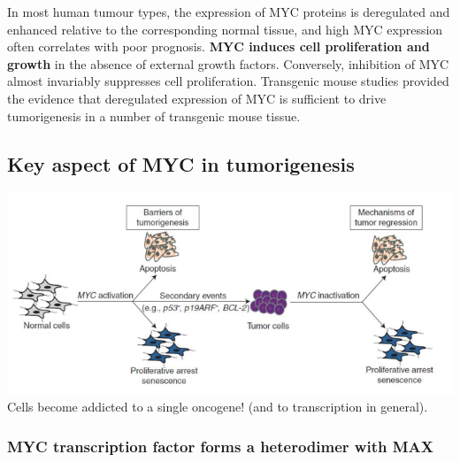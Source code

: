 In most human tumour types, the expression of MYC proteins is deregulated and enhanced relative to the corresponding normal tissue, and high MYC expression often correlates with poor prognosis. \textbf{MYC induces cell proliferation and growth} in the absence of external growth factors. Conversely, inhibition of MYC almost invariably suppresses cell proliferation.
Transgenic mouse studies provided the evidence that deregulated expression of MYC is sufficient to drive tumorigenesis in a number of transgenic mouse tissue.

\hypertarget{key-aspect-of-myc-in-tumorigenesis}{%
\subsection{Key aspect of MYC in tumorigenesis}\label{key-aspect-of-myc-in-tumorigenesis}}

\includegraphics{../_resources/18345a0e70ca9e50883ca61f93ad3405.png}
Cells become addicted to a single oncogene! (and to transcription in general).

\hypertarget{myc-transcription-factor-forms-a-heterodimer-with-max}{%
\subsubsection{MYC transcription factor forms a heterodimer with MAX}\label{myc-transcription-factor-forms-a-heterodimer-with-max}}

